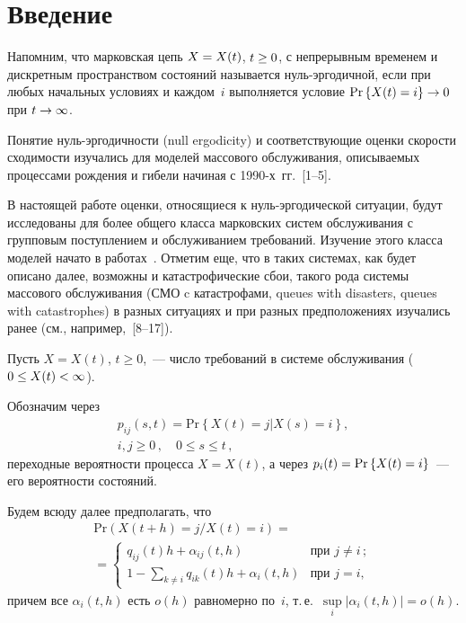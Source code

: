      \begin{multicols}{2}

            \label{st\stat}


\section{Введение}

Напомним, что марковская цепь $X\hm=X(t)$, $t\hm\geq 0$, с непрерывным временем и 
дискретным пространством состояний называется нуль-эр\-го\-дич\-ной, если при любых 
начальных условиях и каждом~$i$ выполняется условие 
$\mathrm{Pr}\left\{ X(t)\hm=i\right\} \hm\to 0$ при $t \hm\to \infty$.

Понятие нуль-эргодичности (null ergodicity) и соответствующие оценки
скорости сходимости изуча\-лись для моделей массового обслуживания,
описываемых процессами рождения и гибели начиная с 1990-х~гг.~[1--5].

В настоящей работе оценки, относящиеся к нуль-эр\-го\-ди\-че\-ской ситуации,
будут исследованы для более общего класса марковских систем
обслуживания  с групповым поступлением и обслуживанием требований.
Изучение этого класса моделей начато в работах~\cite{z11, z12}.
Отметим еще, что в таких системах, как будет описано далее, возможны
и катастрофические сбои,  такого рода системы массового обслуживания
(СМО c катастрофами, queues with disasters, queues with
catastrophes) в разных ситуациях и при разных предположениях
изучались ранее  (см., например,~[8--17]).

Пусть $X=X(t)$, $t\geq 0$,~--- число требований в системе обслуживания 
($0 \hm\le X(t)  \hm< \infty $).

Обозначим через 
\begin{multline*}
p_{ij}(s,t)=\mathrm{Pr}\left\{ X(t)=j\left| X(s)=i\right.
\right\},\\
i,j \ge 0\,,\quad 0\leq s\leq t\,,
\end{multline*}
переходные вероятности
процесса $X=X(t)$, а через  $p_i(t)\hm=\mathrm{Pr}\left\{ X(t) \hm=i \right\}$~---
его вероятности состояний.

Будем всюду далее предполагать, что
\begin{multline*}
\mathrm{Pr}\left(X\left( t+h\right) =j/X\left( t\right) =i\right) = {}\\
{}=
\begin{cases}
q_{ij}\left( t\right)  h+\alpha_{ij}\left(t, h\right) & \mbox {при }j\neq i\,;\\ 
1-\sum\limits_{k\neq i}q_{ik}\left( t\right)  h+\alpha_{i}\left(
t,h\right) & \mbox {при } j=i,
\end{cases}
\end{multline*}
причем все $\alpha_{i}(t,h)$ есть $o(h)$ равномерно по~$i$, т.\,е.\ $\sup\limits_i
|\alpha_i(t,h)| = o(h)$.


\end{multicols}
